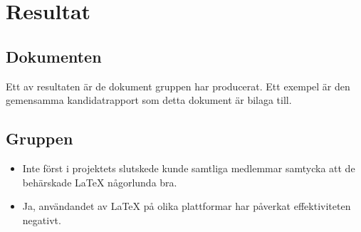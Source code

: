 \section{Resultat}
\subsection{Dokumenten}
Ett av resultaten är de dokument gruppen har producerat. Ett exempel är den gemensamma kandidatrapport som detta dokument är bilaga till. 

\subsection{Gruppen}
\begin{itemize}
	\item Inte först i projektets slutskede kunde samtliga medlemmar samtycka att de behärskade {\LaTeX} någorlunda bra.
	\item Ja, användandet av {\LaTeX} på olika plattformar har påverkat effektiviteten negativt. 
\end{itemize}